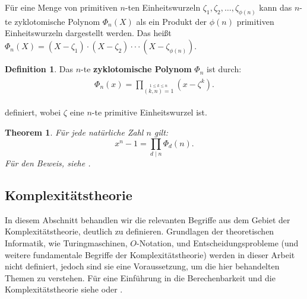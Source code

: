 \documentclass[12pt,oneside]{article}
\newtheorem{theorem}{Theorem}[section]
\theoremstyle{remark}
\theoremstyle{definition}
\newtheorem{definition}{Definition}[section]
\begin{document}
\smallskip

Für eine Menge von primitiven $n$-ten Einheitswurzeln $\zeta_1, \zeta_2, \dots, \zeta_{\phi(n)}$ kann das  $n$-te zyklotomische Polynom $\Phi_{n}(X)$ als ein Produkt der $\phi(n)$ primitiven Einheitswurzeln dargestellt werden. Das heißt $\Phi_{n}(X) = (X - \zeta_1) \cdot (X - \zeta_2) \cdot \cdot \cdot (X - \zeta_{\phi(n)})$. 

\begin{definition}\label{def_cyc_poly}
Das $n$-te \textbf{zyklotomische Polynom} $\Phi_{n}$ ist durch:\newline
\begin{equation}
    \begin{split}
        \begin{aligned}
            \Phi_{n}(x) =  \prod _{\stackrel {1\leq k\leq n}{(k,n)=1}}\left(x- \zeta^k\right).
        \end{aligned}
    \end{split}
\end{equation}

definiert, wobei $\zeta$ eine $n$-te primitive Einheitswurzel ist. 
\end{definition}



\smallskip

\begin{theorem}\label{impor_cyc_lemma}
Für jede natürliche Zahl $n$ gilt:\newline
\begin{equation}
    x^n - 1 = \prod_{d \mid n} \Phi_{d}(n).
\end{equation}
Für den Beweis, siehe \cite{cyclo}. 
\end{theorem}

\smallskip



\smallskip





\subsection{Komplexitätstheorie}

In diesem Abschnitt behandlen wir die relevanten Begriffe aus dem Gebiet der Komplexitätstheorie, deutlich zu definieren. Grundlagen der theoretischen Informatik, wie Turingmaschinen, $O$-Notation, und Entscheidungsprobleme (und weitere fundamentale Begriffe der Komplexitätstheorie) werden in dieser Arbeit nicht definiert, jedoch sind sie eine Voraussetzung, um die hier behandelten Themen zu verstehen. Für eine Einführung in die Berechenbarkeit und die Komplexitätstheorie siehe \cite{comp-compx} oder \cite{com-theory}.\newline
\end{document}
